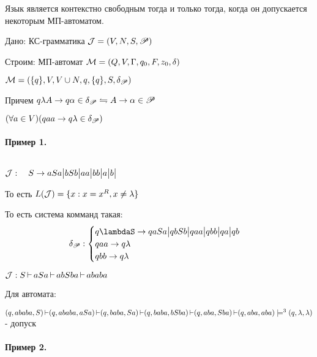 

\title{}
\author{Козырнов Александр Дмитриевич, ИУ7-32Б}
\date{\today}



\begin{theorem}
Язык является контекстно свободным тогда и только тогда, когда он допускается некоторым
МП-автоматом.
\end{theorem}

Дано: КС-грамматика ${\cal J} = (V,N,S,\mathscr{P})$ 

Строим: МП-автомат ${\cal M} = (Q,V,\Gamma, q_0, F, z_0, \delta)$


\medskip

${\cal M} = (\{q\}, V, V \cup N, q, \{q\}, S, \delta_{\mathscr{P}})$

Причем
$q\lambda A \to q\alpha \in \delta_{\mathscr{P}} \leftrightharpoons A \to \alpha \in \mathscr{P}$

\medskip

$(\forall a \in V)(qaa \to q\lambda \in \delta_{\mathscr{P}})$

\paragraph*{Пример 1.} ${}$ \newline

${\cal J}:\quad S \to aSa \big| bSb \big| aa \big| bb \big| a \big| b \big|$ 

То есть $L({\cal J}) = \{x: x = x^{R}, x \neq \lambda\} $

То есть система комманд такая:
\[
\delta_{\scr{P}}: \begin{cases}
    q\lambdaS \to qaSa \big| qbSb \big| qaa \big| qbb \big|qa \big|qb \\
    qaa \to q\lambda\\
    qbb \to q\lambda
\end{cases}
\] 

${\cal J}: S \operatorname{\vdash} aSa \operatorname{\vdash} abSba \operatorname{\vdash} ababa$ 

Для автомата:

$
(q, ababa, S) \operatorname{\vdash} (q, ababa, aSa) \operatorname{\vdash} (q, baba, Sa) \operatorname{\vdash} (q, baba, bSba) \operatorname{\vdash}
(q,aba,Sba) \operatorname{\vdash} (q, aba, aba) \models^{3} (q,\lambda,\lambda)
$ - допуск

\paragraph*{Пример 2.} ${}$ \newline

